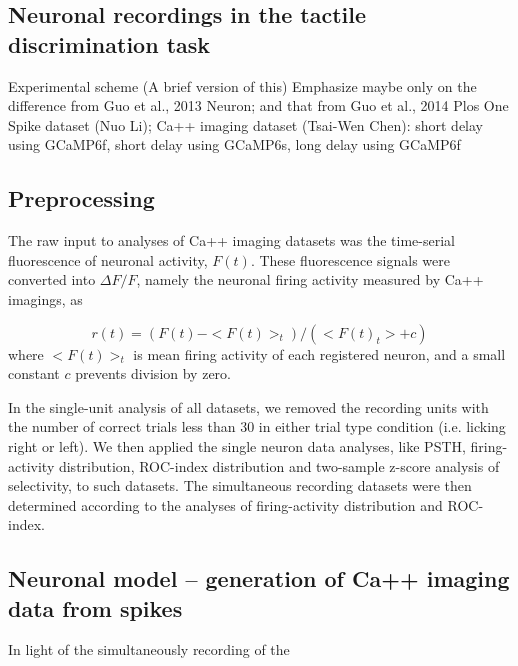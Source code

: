 \documentclass[12pt, oneside]{nature}
\begin{document}
\begin{methods}
\subsection{Neuronal recordings in the tactile discrimination task}
Experimental scheme (A brief version of this)
Emphasize maybe only on the difference from Guo et al., 2013 Neuron;
and that from Guo et al., 2014 Plos One
Spike dataset (Nuo Li); 
Ca++ imaging dataset (Tsai-Wen Chen): 
short delay using GCaMP6f, 
short delay using GCaMP6s, 
long delay using GCaMP6f

\subsection{Preprocessing}
The raw input to analyses of Ca++ imaging datasets
was the time-serial fluorescence of neuronal activity, $F(t)$. 
These fluorescence signals
were converted into $\Delta F/F$, namely the neuronal 
firing activity measured by Ca++ imagings, as

\begin{equation*}
  r(t) = (F(t)-<F(t)>_t)/(<F(t)_t>+c)
\end{equation*}
where $<F(t)>_t$ is mean firing activity of each registered
neuron, and a small constant $c$ prevents division by zero.

In the single-unit analysis of all datasets, we removed the recording units
with the number of correct trials less than 30 in either trial type condition (i.e.
licking right or left). We then applied the single neuron data analyses, like
PSTH, firing-activity distribution, ROC-index distribution and two-sample
z-score analysis of selectivity, to such datasets. The simultaneous recording
datasets were then determined according to the analyses of firing-activity
distribution and ROC-index.



\subsection{Neuronal model -- generation of Ca++ imaging data from spikes}
In light of the simultaneously recording of the 


\end{methods}
\end{document}
